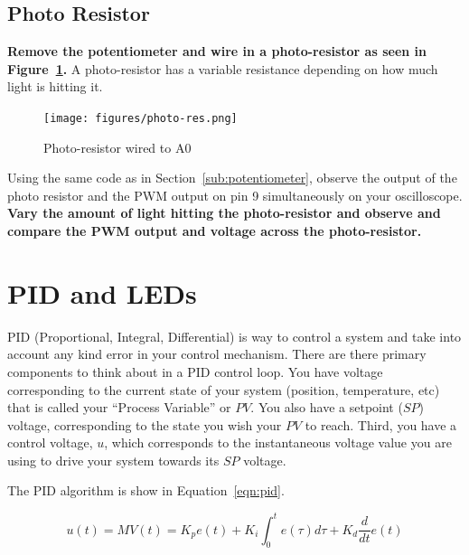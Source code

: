 \documentclass[11pt,a4paper]{article}
\begin{document}

\subsection{Photo Resistor} %
\label{sub:photo_resistor}

\textbf{Remove the potentiometer and wire in a photo-resistor as seen in Figure~\ref{fig:figures_photo-res}.}  A photo-resistor has a variable resistance depending on how much light is hitting it. 
\begin{figure}[htbp]
    \centering
        \texttt{[image: figures/photo-res.png]}
    \caption{Photo-resistor wired to A0}
    \label{fig:figures_photo-res}
\end{figure}

Using the same code as in Section~\ref{sub:potentiometer}, observe the output of the photo resistor and the PWM output on pin 9 simultaneously on your oscilloscope.  \textbf{Vary the amount of light hitting the photo-resistor and observe and compare the PWM output and voltage across the photo-resistor.}    




\section{PID and LEDs} %
\label{sec:pid_and_leds}

PID (Proportional, Integral, Differential) is way to control a system and take into account any kind error in your control mechanism.   There are there primary components to think about in a PID control loop. You have voltage corresponding to the current state of your system (position, temperature, etc) that is called your ``Process Variable'' or $PV$.  You also have a setpoint ($SP$) voltage, corresponding to the state you wish your $PV$ to reach.  Third, you have a control voltage, $u$, which corresponds to the instantaneous voltage value you are using to drive your system towards its $SP$ voltage.

The PID algorithm is show in Equation~\ref{eqn:pid}.


\begin{equation}
    \label{eqn:pid}
    u(t) = MV(t) = K_{p} e(t) + K_{i} \int _{0}^t e(\tau)d\tau + K_{d} \frac{d}{dt}e(t)
\end{equation}
\end{document}
